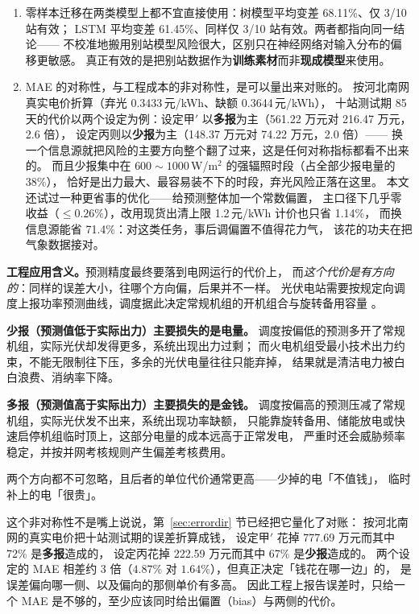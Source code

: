 \documentclass[11pt,a4paper]{ctexart}
\begin{document}
\begin{enumerate}
\item 零样本迁移在两类模型上都不宜直接使用：树模型平均变差 68.11\%、仅 3/10 站有效；
LSTM 平均变差 61.45\%、同样仅 3/10 站有效。两者都指向同一结论——
不校准地搬用别站模型风险很大，区别只在神经网络对输入分布的偏移更敏感。
真正有效的是把别站数据作为\textbf{训练素材}而非\textbf{现成模型}来使用。

\item MAE 的对称性，与工程成本的非对称性，是可以量出来对账的。
按河北南网真实电价折算（弃光 0.3433\,元/kWh、缺额 0.3644\,元/kWh），
十站测试期 85 天的代价以两个设定为例：设定甲$'$ 以\textbf{多报}为主（561.22 万元对 216.47 万元，2.6 倍），
设定丙则以\textbf{少报}为主（148.37 万元对 74.22 万元，2.0 倍）——
换一个信息源就把风险的主要方向整个翻了过来，这是任何对称指标都看不出来的。
而且少报集中在 $600\sim1000$\,W/m$^2$ 的强辐照时段（占全部少报电量的 38\%），
恰好是出力最大、最容易装不下的时段，弃光风险正落在这里。
本文还试过一种更省事的优化——给预测整体加一个常数偏置，
主口径下几乎零收益（$\le0.26\%$），改用现货出清上限 1.2\,元/kWh 计价也只省 1.14\%，
而换信息源能省 71.4\%：对这类任务，事后调偏置不值得花力气，
该花的功夫在把气象数据接对。

\end{enumerate}

\noindent\textbf{工程应用含义。}预测精度最终要落到电网运行的代价上，
而\emph{这个代价是有方向的}：同样的误差大小，往哪个方向偏，后果并不一样。
光伏电站需要按规定向调度上报功率预测曲线，调度据此决定常规机组的开机组合与旋转备用容量
\cite{inman2013solar}。

\textbf{少报（预测值低于实际出力）主要损失的是电量。}
调度按偏低的预测多开了常规机组，实际光伏却发得更多，系统出现出力过剩；
而火电机组受最小技术出力约束，不能无限制往下压，多余的光伏电量往往只能弃掉，
结果就是清洁电力被白白浪费、消纳率下降。

\textbf{多报（预测值高于实际出力）主要损失的是金钱。}
调度按偏高的预测压减了常规机组，实际光伏发不出来，系统出现功率缺额，
只能靠旋转备用、储能放电或快速启停机组临时顶上，这部分电量的成本远高于正常发电，
严重时还会威胁频率稳定，并按并网考核规则产生偏差考核费用。

两个方向都不可忽略，且后者的单位代价通常更高——少掉的电「不值钱」，
临时补上的电「很贵」。

这个非对称性不是嘴上说说，第~\ref{sec:errordir} 节已经把它量化了对账：
按河北南网的真实电价把十站测试期的误差折算成钱，
设定甲$'$ 花掉 777.69 万元而其中 72\% 是\textbf{多报}造成的，
设定丙花掉 222.59 万元而其中 67\% 是\textbf{少报}造成的。
两个设定的 MAE 相差约 3 倍（$4.87\%$ 对 $1.64\%$），但真正决定「钱花在哪一边」的，
是误差偏向哪一侧、以及偏向的那侧单价有多高。
因此工程上报告误差时，只给一个 MAE 是不够的，至少应该同时给出偏置（bias）与两侧的代价。
\end{document}
